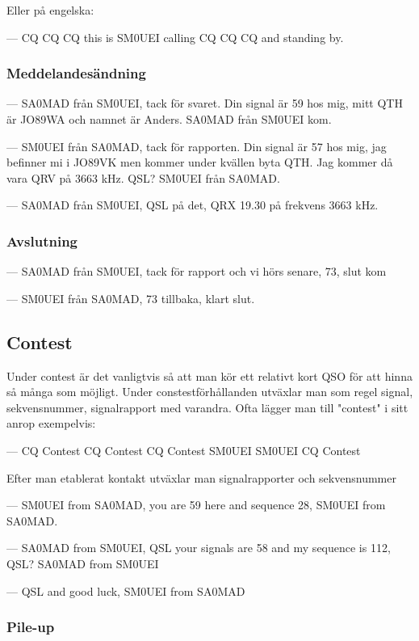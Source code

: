 Eller på engelska:

--- CQ CQ CQ this is SM0UEI calling CQ CQ CQ and standing by.

\subsubsection{Meddelandesändning}

--- SA0MAD från SM0UEI, tack för svaret. Din signal är 59 hos mig, mitt QTH är JO89WA och namnet är Anders. SA0MAD från SM0UEI kom.

--- SM0UEI från SA0MAD, tack för rapporten. Din signal är 57 hos mig, jag befinner mi i JO89VK men kommer under kvällen byta QTH. Jag kommer då vara QRV på 3663 kHz. QSL? SM0UEI från SA0MAD.

--- SA0MAD från SM0UEI, QSL på det, QRX 19.30 på frekvens 3663 kHz. 

\subsubsection{Avslutning}

--- SA0MAD från SM0UEI, tack för rapport och vi hörs senare, 73, slut kom

--- SM0UEI från SA0MAD, 73 tillbaka, klart slut.

\subsection{Contest}

Under contest är det vanligtvis så att man kör ett relativt kort QSO för att hinna så många som möjligt. Under constestförhållanden utväxlar man som regel signal, sekvensnummer, signalrapport med varandra. Ofta lägger man till "contest" i sitt anrop exempelvis:

--- CQ Contest CQ Contest CQ Contest SM0UEI SM0UEI CQ Contest

Efter man etablerat kontakt utväxlar man signalrapporter och sekvensnummer

--- SM0UEI from SA0MAD, you are 59 here and sequence 28, SM0UEI from SA0MAD.

--- SA0MAD from SM0UEI, QSL your signals are 58 and my sequence is 112, QSL? SA0MAD from SM0UEI

--- QSL and good luck, SM0UEI from SA0MAD

\subsubsection{Pile-up}

